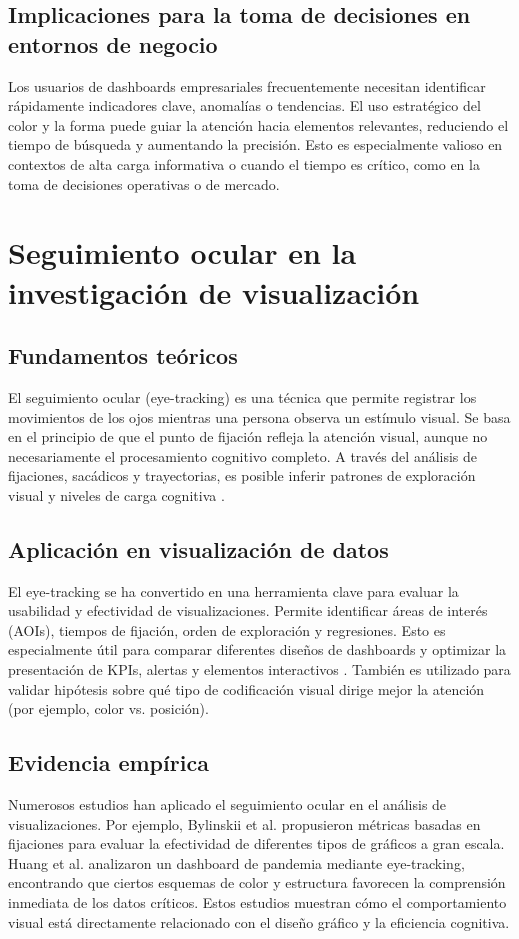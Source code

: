 \documentclass[12pt]{article}
\begin{document}
\subsection{Implicaciones para la toma de decisiones en entornos de negocio}
Los usuarios de dashboards empresariales frecuentemente necesitan identificar rápidamente indicadores clave, anomalías o tendencias. El uso estratégico del color y la forma puede guiar la atención hacia elementos relevantes, reduciendo el tiempo de búsqueda y aumentando la precisión. Esto es especialmente valioso en contextos de alta carga informativa o cuando el tiempo es crítico, como en la toma de decisiones operativas o de mercado.


\section{Seguimiento ocular en la investigación de visualización}

\subsection{Fundamentos teóricos}
El seguimiento ocular (eye-tracking) es una técnica que permite registrar los movimientos de los ojos mientras una persona observa un estímulo visual. Se basa en el principio de que el punto de fijación refleja la atención visual, aunque no necesariamente el procesamiento cognitivo completo. A través del análisis de fijaciones, sacádicos y trayectorias, es posible inferir patrones de exploración visual y niveles de carga cognitiva \parencite{duchowski2017}.

\subsection{Aplicación en visualización de datos}
El eye-tracking se ha convertido en una herramienta clave para evaluar la usabilidad y efectividad de visualizaciones. Permite identificar áreas de interés (AOIs), tiempos de fijación, orden de exploración y regresiones. Esto es especialmente útil para comparar diferentes diseños de dashboards y optimizar la presentación de KPIs, alertas y elementos interactivos \parencite{burch2017}. También es utilizado para validar hipótesis sobre qué tipo de codificación visual dirige mejor la atención (por ejemplo, color vs. posición).

\subsection{Evidencia empírica}
Numerosos estudios han aplicado el seguimiento ocular en el análisis de visualizaciones. Por ejemplo, Bylinskii et al. \parencite{bylinskii2017} propusieron métricas basadas en fijaciones para evaluar la efectividad de diferentes tipos de gráficos a gran escala. Huang et al. \parencite{huang2022} analizaron un dashboard de pandemia mediante eye-tracking, encontrando que ciertos esquemas de color y estructura favorecen la comprensión inmediata de los datos críticos. Estos estudios muestran cómo el comportamiento visual está directamente relacionado con el diseño gráfico y la eficiencia cognitiva.
\end{document}
